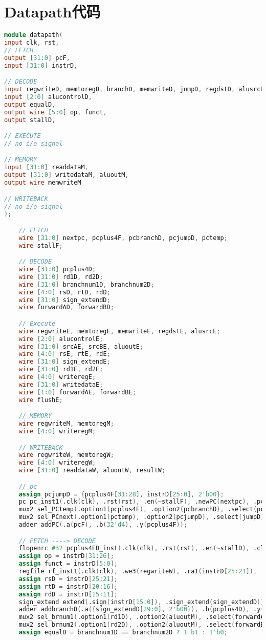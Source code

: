\appendix
\section{Datapath代码}
\begin{lstlisting}[language=Verilog]
module datapath(
input clk, rst,
// FETCH
output [31:0] pcF,
input [31:0] instrD,

// DECODE
input regwriteD, memtoregD, branchD, memwriteD, jumpD, regdstD, alusrcD, pcsrcD,
input [2:0] alucontrolD,
output equalD,
output wire [5:0] op, funct,
output stallD,

// EXECUTE
// no i/o signal

// MEMORY
input [31:0] readdataM,
output [31:0] writedataM, aluoutM,
output wire memwriteM

// WRITEBACK
// no i/o signal
);

    // FETCH
    wire [31:0] nextpc, pcplus4F, pcbranchD, pcjumpD, pctemp;
    wire stallF;

    // DECODE
    wire [31:0] pcplus4D;
    wire [31:0] rd1D, rd2D;
    wire [31:0] branchnum1D, branchnum2D;
    wire [4:0] rsD, rtD, rdD;
    wire [31:0] sign_extendD;
    wire forwardAD, forwardBD;

    // Execute
    wire regwriteE, memtoregE, memwriteE, regdstE, alusrcE;
    wire [2:0] alucontrolE;
    wire [31:0] srcAE, srcBE, aluoutE;
    wire [4:0] rsE, rtE, rdE;
    wire [31:0] sign_extendE;
    wire [31:0] rd1E, rd2E;
    wire [4:0] writeregE;
    wire [31:0] writedataE;
    wire [1:0] forwardAE, forwardBE; 
    wire flushE;

    // MEMORY
    wire regwriteM, memtoregM;
    wire [4:0] writeregM;

    // WRITEBACK
    wire regwriteW, memtoregW;
    wire [4:0] writeregW;
    wire [31:0] readdataW, aluoutW, resultW;

    // pc
    assign pcjumpD = {pcplus4F[31:28], instrD[25:0], 2'b00};
    pc pc_inst1(.clk(clk), .rst(rst), .en(~stallF), .newPC(nextpc), .pc(pcF));
    mux2 sel_PCtemp(.option1(pcplus4F), .option2(pcbranchD), .select(pcsrcD), .data(pctemp));
    mux2 sel_PCnext(.option1(pctemp), .option2(pcjumpD), .select(jumpD), .data(nextpc), .rst(rst));
    adder addPC(.a(pcF), .b(32'd4), .y(pcplus4F));

    // FETCH ----> DECODE
    flopenrc #32 pcplus4FD_inst(.clk(clk), .rst(rst), .en(~stallD), .clear(pcsrcD), .d(pcplus4F), .q(pcplus4D));
    assign op = instrD[31:26];
    assign funct = instrD[5:0];
    regfile rf_inst1(.clk(clk), .we3(regwriteW), .ra1(instrD[25:21]), .ra2(instrD[20:16]), .wa3(writeregW), .wd3(resultW), .rd1(rd1D), .rd2(rd2D));
    assign rsD = instrD[25:21];
    assign rtD = instrD[20:16];
    assign rdD = instrD[15:11];
    sign_extend extend(.sign(instrD[15:0]), .sign_extend(sign_extendD)); 
    adder addbranchD(.a({sign_extendD[29:0], 2'b00}), .b(pcplus4D), .y(pcbranchD));
    mux2 sel_brnum1(.option1(rd1D), .option2(aluoutM), .select(forwardAD), .data(branchnum1D));
    mux2 sel_brnum2(.option1(rd2D), .option2(aluoutM), .select(forwardBD), .data(branchnum2D));
    assign equalD = branchnum1D == branchnum2D ? 1'b1 : 1'b0;


\end{lstlisting}
